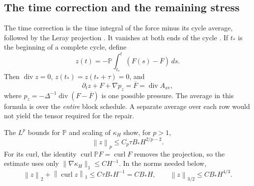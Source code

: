 \documentclass[11pt,a4paper,reqno]{amsart}
\theoremstyle{plain}
\theoremstyle{definition}
\theoremstyle{remark}
\numberwithin{equation}{section}
\newcommand{\PP}{\mathbb P}
\newcommand{\curl}{\operatorname{curl}}
\newcommand{\Div}{\operatorname{div}}
\newcommand{\norm}[2]{\left\|#1\right\|_{#2}}
\begin{document}
\subsection{The time correction and the remaining stress}

The time correction is the time integral of the force minus its
cycle average, followed by the Leray projection
\cite[(4.76)--(4.78)]{BCK}. It vanishes at both ends of the cycle
\cite[Remark~4.1]{BCK}. If $t_*$ is the beginning of a complete
cycle, define
\begin{equation}\label{eq:time-corrector}
 z(t)=-\PP\int_{t_*}^t
                 (F(s)-\overline F)\,ds.
\end{equation}
Then $\Div z=0$, $z(t_*)=z(t_*+\tau)=0$, and
\begin{equation}\label{eq:corrector-equation}
 \partial_tz+F+\nabla p_z
                    =\overline F=\Div A_{\mathrm{av}},
\end{equation}
where
$p_z=-\Delta^{-1}\Div(F-\overline F)$ is one possible pressure.
The average in this formula is over the \emph{entire} block schedule.
A separate average over each row would not yield the tensor required
for the repair.

The $L^p$ bounds for $\PP$ and scaling of $\kappa_H$ show, for $p>1$,
\[
 \norm zp\le C_p\tau B_*H^{2/p-2}.
\]
For its curl, the identity $\curl\PP F=\curl F$ removes the
projection, so the estimate uses only
$\|\nabla \kappa_H\|_1\le CH^{-1}$.
In the norms needed below,
\begin{equation}\label{eq:corrector-bounds}
 \norm z2+\norm{\curl z}1\le C\tau B_*H^{-1}=CB_*H,
 \qquad
 \norm z{3/2}\le CB_*H^{4/3}.
\end{equation}
\end{document}
